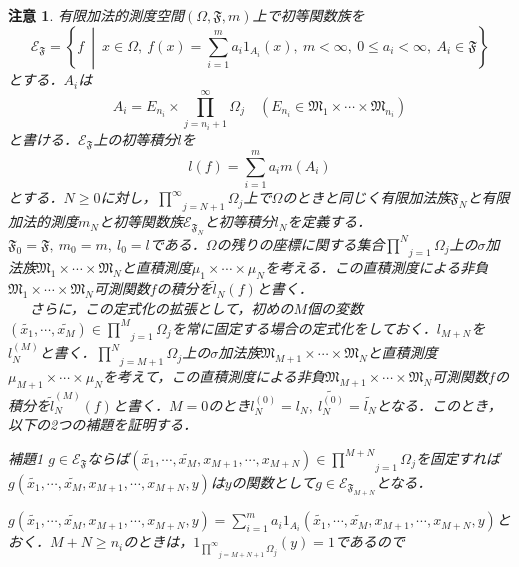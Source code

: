 \documentclass[a4paper,11pt]{jsarticle}
\newtheorem{attention}{注意}
\begin{document}
\begin{attention}
有限加法的測度空間$(\Omega,\mathfrak{F},m)$上で初等関数族を
\begin{equation*}
\mathcal{E}_{\mathfrak{F}}=\left\{f{\ }\middle|{\ }x\in \Omega,{\ }f(x)=\sum_{i=1}^ma_i1_{A_i}(x),{\ }m<\infty,{\ }0\leq a_i<\infty,{\ }A_i\in\mathfrak{F}\right\}
\end{equation*}
とする．$A_i$は
\begin{equation*}
A_i=E_{n_i}\times\prod_{j=n_i+1}^\infty\Omega_j \quad (E_{n_i}\in \mathfrak{M}_1\times\cdots\times\mathfrak{M}_{n_i})
\end{equation*}
と書ける．$\mathcal{E}_{\mathfrak{F}}$上の初等積分$l$を
\begin{equation*}
l(f)=\sum_{i=1}^ma_im(A_i)
\end{equation*}
とする．$N\geq 0$に対し，$\underset{j=N+1}{\overset{\infty}{\prod}}\Omega_j$上で$\Omega$のときと同じく有限加法族$\mathfrak{F}_N$と有限加法的測度$m_N$と初等関数族$\mathcal{E}_{\mathfrak{F}_N}$と初等積分$l_N$を定義する．$\mathfrak{F}_0=\mathfrak{F},{\ }m_0=m,{\ }l_0=l$である．$\Omega$の残りの座標に関する集合$\underset{j=1}{\overset{N}{\prod}}\Omega_j$上の$\sigma$加法族$\mathfrak{M}_1\times\cdots\times\mathfrak{M}_N$と直積測度$\mu_1\times\cdots\times\mu_N$を考える．この直積測度による非負$\mathfrak{M}_1\times\cdots\times\mathfrak{M}_N$可測関数$f$の積分を$\widetilde{l}_N(f)$と書く．\\
{\ }{\ }{\ }さらに，この定式化の拡張として，初めの$M$個の変数$(\widetilde{x_1},\cdots,\widetilde{x_M})\in\underset{j=1}{\overset{M}{\prod}}\Omega_j$を常に固定する場合の定式化をしておく．$l_{M+N}$を$l^{(M)}_N$と書く．$\underset{j=M+1}{\overset{N}{\prod}}\Omega_j$上の$\sigma$加法族$\mathfrak{M}_{M+1}\times\cdots\times\mathfrak{M}_N$と直積測度$\mu_{M+1}\times\cdots\times\mu_N$を考えて，この直積測度による非負$\mathfrak{M}_{M+1}\times\cdots\times\mathfrak{M}_N$可測関数$f$の積分を$\widetilde{l}^{(M)}_N(f)$と書く．$M=0$のとき$l^{(0)}_N=l_N,{\ }\widetilde{l^{(0)}_N}=\widetilde{l_N}$となる．このとき，以下の2つの補題を証明する．
\begin{itembox}[l]{補題1}
$g\in\mathcal{E}_{\mathfrak{F}}$ならば$(\widetilde{x_1},\cdots,\widetilde{x_M},x_{M+1},\cdots,x_{M+N})\in\underset{j=1}{\overset{M+N}{\prod}}\Omega_j$を固定すれば$g(\widetilde{x_1},\cdots,\widetilde{x_M},x_{M+1},\cdots,x_{M+N},y)$は$y$の関数として$g\in\mathcal{E}_{\mathfrak{F}_{M+N}}$となる．
\end{itembox}
$\displaystyle g(\widetilde{x_1},\cdots,\widetilde{x_M},x_{M+1},\cdots,x_{M+N},y)=\sum_{i=1}^ma_i1_{A_i}(\widetilde{x_1},\cdots,\widetilde{x_M},x_{M+1},\cdots,x_{M+N},y)$とおく．$M+N\geq n_i$のときは，$1_{\underset{j=M+N+1}{\overset{\infty}{\prod}}\Omega_j}(y)=1$であるので

\end{attention}
\end{document}
